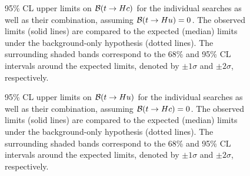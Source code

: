 \begin{figure}[h!]
\begin{center}
\caption{\small {95\% CL upper limits on $\mathcal{B}(t\to Hc)$ for the individual searches as well as their
combination, assuming $\mathcal{B}(t\to Hu)=0$. The observed limits (solid lines) are compared to the 
expected (median) limits under the background-only
hypothesis (dotted lines). The surrounding shaded bands correspond to the 68\% and 95\% CL intervals around the expected limits, 
denoted by $\pm 1\sigma$ and $\pm 2\sigma$, respectively.
}}
\label{fig:limits_combo_1D_hc} 
\end{center}
\end{figure}

\begin{figure}[h!]
\begin{center}
\caption{\small {95\% CL upper limits on $\mathcal{B}(t\to Hu)$ for the individual searches as well as their
combination, assuming $\mathcal{B}(t\to Hc)=0$. The observed limits (solid lines) are compared to the 
expected (median) limits under the background-only
hypothesis (dotted lines). The surrounding shaded bands correspond to the 68\% and 95\% CL intervals around the expected limits, 
denoted by $\pm 1\sigma$ and $\pm 2\sigma$, respectively.
}}
\label{fig:limits_combo_1D_hu} 
\end{center}
\end{figure}

